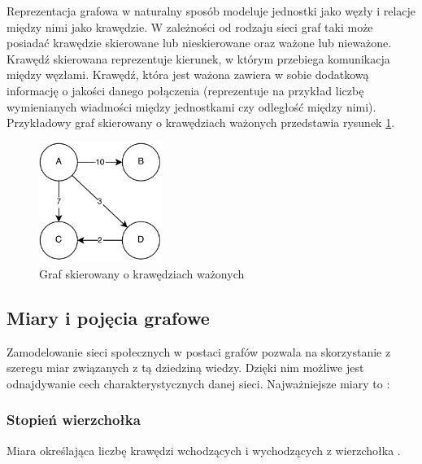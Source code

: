 Reprezentacja grafowa w naturalny sposób modeluje jednostki jako węzły i relacje
między nimi jako krawędzie. W zależności od rodzaju sieci graf taki może
posiadać krawędzie skierowane lub nieskierowane oraz ważone lub nieważone.
Krawędź skierowana reprezentuje kierunek, w którym przebiega komunikacja między
węzłami. Krawędź, która jest ważona zawiera w sobie dodatkową informację o
jakości danego połączenia (reprezentuje na przykład liczbę wymienianych
wiadmości między jednostkami czy odległość między nimi).
Przykładowy graf skierowany o krawędziach ważonych przedstawia rysunek
\ref{image:graf-skierowany}.

\begin{figure}[ht!]
\centering
\includegraphics[width=40mm]{img/graf-skierowany.png}
\caption{Graf skierowany o krawędziach ważonych}
\label{image:graf-skierowany}
\end{figure}

















\subsection{Miary i pojęcia grafowe}
Zamodelowanie sieci społecznych w postaci grafów pozwala na skorzystanie z szeregu
miar związanych z tą dziedziną wiedzy. Dzięki nim możliwe jest odnajdywanie cech
charakterystycznych danej sieci. Najważniejsze miary to \cite{estrada}: 


\subsubsection{Stopień wierzchołka}
Miara określająca liczbę krawędzi wchodzących i wychodzących z wierzchołka
.
  
